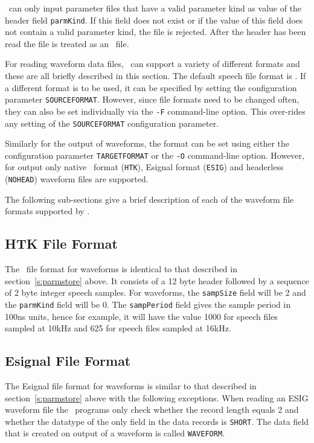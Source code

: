 \HTK\ can only input parameter files that have a valid parameter kind as value
of the header field \texttt{parmKind}. If this field does not exist or if the
value of this field does not contain a valid parameter kind, the file is 
rejected. After the header has been read the file is treated as an \HTK\ file.



For reading waveform data files, \HTK\ can support a variety of different
formats and these are all briefly described in this section.  The default
speech file format is \HTK. If a different format is to be used, it can be
specified by setting the configuration parameter
\texttt{SOURCEFORMAT}.  However,
since file formats need to be changed often, they can also be set individually
via the \texttt{-F} command-line
option.  This over-rides any setting of the \texttt{SOURCEFORMAT} configuration
parameter.

Similarly for the output of waveforms, the format can be set using either the
configuration parameter \texttt{TARGETFORMAT} or the \texttt{-O} command-line
option.  However, for output only native \HTK\ format (\texttt{HTK}), Esignal
format (\texttt{ESIG}) and headerless (\texttt{NOHEAD}) waveform files are
supported.

The following sub-sections give a brief description of each of the waveform
file formats supported by \HTK.

\subsection{HTK File Format}

The \HTK\ file format for waveforms is identical to that described in
section~\ref{s:parmstore} above.  It consists of a 12 byte header followed
by a sequence of 2 byte integer speech samples.  For waveforms, the
\texttt{sampSize} field will be 2 and the \texttt{parmKind} field will be 0.
The \texttt{sampPeriod} field gives the sample period in 100ns units, hence for
example, it will have the value 1000 for speech files sampled at 10kHz and 625
for speech files sampled at 16kHz.

\subsection{Esignal File Format}

The Esignal file format for waveforms is similar to that described in
section~\ref{s:parmstore} above with the following exceptions. When reading an
ESIG waveform file the \HTK\ programs only check whether the record length
equals 2 and whether the datatype of the only field in the data records is
\texttt{SHORT}. The data field that is created on output of a waveform is
called \texttt{WAVEFORM}.

